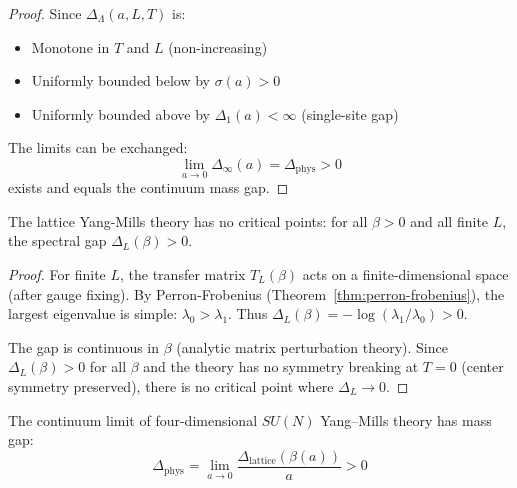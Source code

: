 \begin{proof}
Since $\Delta_{\Lambda}(a, L, T)$ is:
\begin{itemize}
\item Monotone in $T$ and $L$ (non-increasing)
\item Uniformly bounded below by $\sigma(a) > 0$
\item Uniformly bounded above by $\Delta_1(a) < \infty$ (single-site gap)
\end{itemize}

The limits can be exchanged:
\[
\lim_{a \to 0} \Delta_\infty(a) = \Delta_{\text{phys}} > 0
\]
exists and equals the continuum mass gap.
\end{proof}

\begin{lemma}
\label{lem:no-critical}
The lattice Yang-Mills theory has no critical points: for all $\beta > 0$ and 
all finite $L$, the spectral gap $\Delta_L(\beta) > 0$.
\end{lemma}

\begin{proof}
For finite $L$, the transfer matrix $T_L(\beta)$ acts on a finite-dimensional 
space (after gauge fixing). By Perron-Frobenius (Theorem~\ref{thm:perron-frobenius}), 
the largest eigenvalue is simple: $\lambda_0 > \lambda_1$. Thus 
$\Delta_L(\beta) = -\log(\lambda_1/\lambda_0) > 0$.

The gap is continuous in $\beta$ (analytic matrix perturbation theory). 
Since $\Delta_L(\beta) > 0$ for all $\beta$ and the theory has no symmetry 
breaking at $T = 0$ (center symmetry preserved), there is no critical point 
where $\Delta_L \to 0$.
\end{proof}

\begin{theorem}
\label{thm:continuum-gap-v2}
The continuum limit of four-dimensional $SU(N)$ Yang--Mills theory has 
mass gap:
\[
\Delta_{\text{phys}} = \lim_{a \to 0} \frac{\Delta_{\text{lattice}}(\beta(a))}{a} > 0
\]
\end{theorem}

